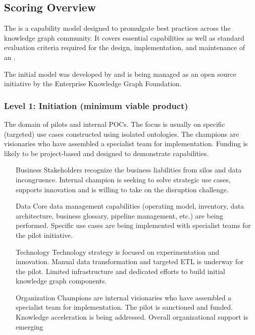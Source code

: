 \subsection{Scoring Overview}

The  is a capability model designed to promulgate best practices across the knowledge graph community.
It covers essential capabilities as well as standard evaluation criteria required for the design, implementation,
and maintenance of an .

The initial model was developed by \agnos and is being managed as an open source initiative by the
Enterprise Knowledge Graph Foundation.

\subsubsection{Level 1:  Initiation (minimum viable product)}

The domain of pilots and internal POCs.
The focus is usually on specific (targeted) use cases constructed using isolated ontologies.
The champions are visionaries who have assembled a specialist team for implementation.
Funding is likely to be project-based and designed to demonstrate capabilities.

\begin{itemize}[leftmargin=1in]

    \item[Business]     Stakeholders recognize the business liabilities from silos and data incongruence.
                        Internal champion is seeking to solve strategic use cases, supports innovation and is willing
                        to take on the disruption challenge.
    \item[Data]         Core data management capabilities (operating model, inventory, data architecture, business
                        glossary, pipeline management, etc.) are being performed.
                        Specific use cases are being implemented with specialist teams for the pilot initiative.
    \item[Technology]   Technology strategy is focused on experimentation and innovation.
                        Manual data transformation and targeted ETL is underway for the pilot.
                        Limited infrastructure and dedicated efforts to build initial knowledge graph components.
    \item[Organization] Champions are internal visionaries who have assembled a specialist team for implementation.
                        The pilot is sanctioned and funded.
                        Knowledge acceleration is being addressed.
                        Overall organizational support is emerging

\end{itemize}


